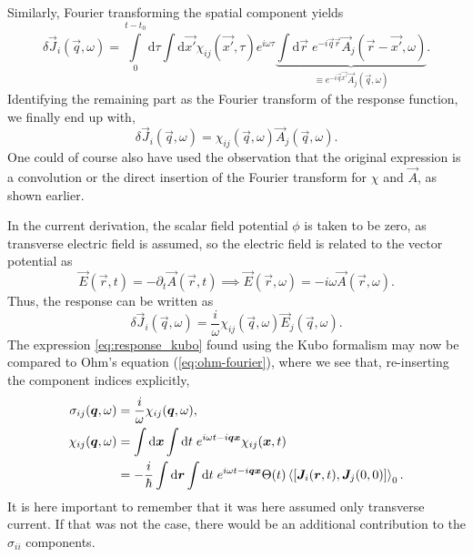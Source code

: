 Similarly, Fourier transforming the spatial component yields
\begin{equation}
  \label{eq:resonse_fourier}
  \delta \vec{J}_{i}(\vec{q}, \omega) =
  \int\limits_0^{t - t_0}\mathrm{d}\tau
  \int \mathrm{d} \vec{x'}
  \chi_{ij}(\vec{x'}, \tau)
  e^{i \omega\tau}
  \underbrace{
    \int \mathrm{d}\vec{r} \;
    e^{-i \vec{q} \vec{r}}
  \vec{A}_{j}(\vec{r} - \vec{x'}, \omega)
  }_{\equiv e^{-i \vec{q} \vec{x'}} \vec{A}_{j}(\vec{q}, \omega)}.
\end{equation}
Identifying the remaining part as the Fourier transform of the response function, we finally end up with,
\begin{equation}
  \delta \vec{J}_{i}(\vec{q}, \omega) =
  \chi_{ij}(\vec{q}, \omega)
  \vec{A}_{j}(\vec{q}, \omega).
\end{equation}
One could of course also have used the observation that the original expression is a convolution or the direct insertion of the Fourier transform for $\chi $ and $\vec{A}$, as shown earlier.

In the current derivation, the scalar field potential $\phi$ is taken to be zero, as transverse electric field is assumed, so the electric field is related to the vector potential as
\begin{equation}
  \label{eq:em_field_electric}
  \vec{E}(\vec{r}, t) = -\partial_t \vec{A}(\vec{r}, t) \implies \vec{E}(\vec{r}, \omega) = -i \omega \vec{A}(\vec{r}, \omega).
\end{equation}
Thus, the response can be written as
\begin{equation}
  \label{eq:response_kubo}
  \delta \vec{J}_{i}(\vec{q}, \omega) =
  \frac{i}{\omega}
  \chi_{ij}(\vec{q}, \omega)
  \vec{E}_{j}(\vec{q}, \omega).
\end{equation}
The expression \eqref{eq:response_kubo} found using the Kubo formalism may now be compared to Ohm's equation (\ref{eq:ohm-fourier}), where we see that, re-inserting the component indices explicitly,
\begin{align}
    \sigma_{ij}(\vec{q}, \omega) &= \frac{i}{\omega} \chi_{ij}(\vec{q}, \omega), \\
  \chi_{ij}(\vec{q}, \omega) &= \int \mathrm{d}\vec{x} \int \mathrm{d} t \; e^{i\omega t -i \vec{q} \vec{x}}\chi_{ij}(\vec{x}, t)\\
  &=
    -\frac{i}{\hbar}\int \mathrm{d} \vec{r} \int \mathrm{d} t \; e^{i \omega t - i \vec{q} \vec{x}}
    \Theta (t)
    \Braket{\left[
       \vec{J}_{i}(\vec{r}, t), \vec{J}_{j}(0, 0)
      \right]}_0. \nonumber
\end{align}
It is here important to remember that it was here assumed only transverse current.
If that was not the case, there would be an additional contribution to the $\sigma_{ii}$ components.


